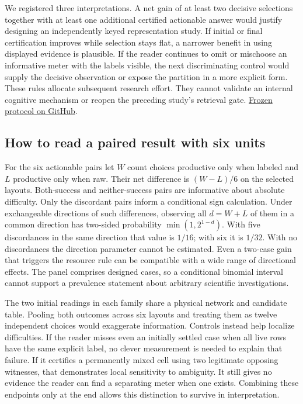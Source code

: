 \documentclass[12pt,letterpaper]{article}
\begin{document}
We registered three interpretations. A net gain of at least two decisive selections together with at least one additional certified actionable answer would justify designing an independently keyed representation study. If initial or final certification improves while selection stays flat, a narrower benefit in using displayed evidence is plausible. If the reader continues to omit or mischoose an informative meter with the labels visible, the next discriminating control would supply the decisive observation or expose the partition in a more explicit form. These rules allocate subsequent research effort. They cannot validate an internal cognitive mechanism or reopen the preceding study's retrieval gate. \href{https://github.com/nousentllc/riemann-hypothesis/commit/61cfbf1743ee0bf2383199f1ab4fe3442c5bf65b}{Frozen protocol on GitHub}.

\subsection{How to read a paired result with six units}

For the six actionable pairs let $W$ count choices productive only when labeled and $L$ productive only when raw. Their net difference is $(W-L)/6$ on the selected layouts. Both-success and neither-success pairs are informative about absolute difficulty. Only the discordant pairs inform a conditional sign calculation. Under exchangeable directions of such differences, observing all $d=W+L$ of them in a common direction has two-sided probability $\min(1,2^{1-d})$. With five discordances in the same direction that value is $1/16$; with six it is $1/32$. With no discordances the direction parameter cannot be estimated. Even a two-case gain that triggers the resource rule can be compatible with a wide range of directional effects. The panel comprises designed cases, so a conditional binomial interval cannot support a prevalence statement about arbitrary scientific investigations.

The two initial readings in each family share a physical network and candidate table. Pooling both outcomes across six layouts and treating them as twelve independent choices would exaggerate information. Controls instead help localize difficulties. If the reader misses even an initially settled case when all live rows have the same explicit label, no clever measurement is needed to explain that failure. If it certifies a permanently mixed cell using two legitimate opposing witnesses, that demonstrates local sensitivity to ambiguity. It still gives no evidence the reader can find a separating meter when one exists. Combining these endpoints only at the end allows this distinction to survive in interpretation.
\end{document}
